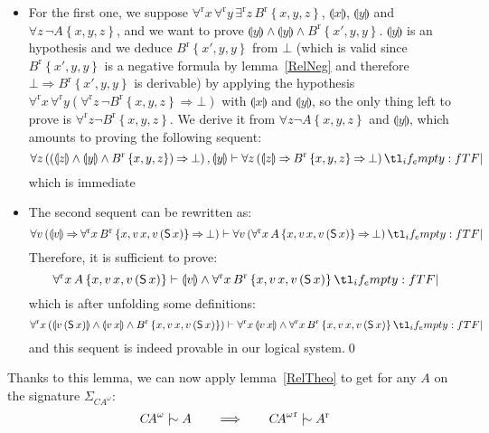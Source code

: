 \documentclass{CSML}
\newcommand*\ifpresent[3]{\tl_if_empty:fTF{#1}{#3}{#2}}
\newcommand*\Entails{\mathrel{\vdash}}
\newcommand*\Derives{\mathrel{|\mkern-8.75mu\sim}}
\newcommand*\BarSep{\mathrel{|}}
\newcommand*\Sequent[3]{#1\Entails#2\ifpresent{#3}{\BarSep}{}#3}
\newcommand*\LogVarA{x}
\newcommand*\LogVarB{y}
\newcommand*\LogVarC{z}
\newcommand*\LogVarE{v}
\newcommand*\LogConst[1]{\mathsf{#1}}
\newcommand*\LogImp{\mathbin{\Rightarrow}}
\newcommand*\LogAnd{\mathbin{\wedge}}
\newcommand*\LogBot\bot
\newcommand*\LogRel[1]{\llparenthesis#1\rrparenthesis}
\newcommand*\LogRelForm[1]{{#1^\mathrm{r}}}
\newcommand*\LogForallRel{\forall^\mathrm{r}}
\newcommand*\LogExistsRel{\exists^\mathrm{r}}
\newcommand*\LogFormA{A}
\newcommand*\LogFormB{B}
\newcommand*\LogSubst[1]{\left\{#1\right\}}
\newcommand*\CA{{C\!A}}
\newcommand*\CAom{{\CA^\omega}}
\newcommand*\CALogS{\LogConst{S}}
\begin{document}
\begin{itemize}
\item For the first one, we suppose $\LogForallRel\LogVarA\,\LogForallRel\LogVarB\,\LogExistsRel\LogVarC\,\LogRelForm{\LogFormB}\LogSubst{\LogVarA,\LogVarB,\LogVarC}$, $\LogRel{\LogVarA}$, $\LogRel{\LogVarB}$ and $\forall\LogVarC\,\neg\LogFormA\LogSubst{\LogVarA,\LogVarB,\LogVarC}$, and we want to prove $\LogRel{\LogVarB}\LogAnd\LogRel{\LogVarB}\LogAnd\LogRelForm{\LogFormB}\LogSubst{\LogVarA',\LogVarB,\LogVarB}$. $\LogRel{\LogVarB}$ is an hypothesis and we deduce $\LogRelForm{\LogFormB}\LogSubst{\LogVarA',\LogVarB,\LogVarB}$ from $\LogBot$ (which is valid since $\LogRelForm{\LogFormB}\LogSubst{\LogVarA',\LogVarB,\LogVarB}$ is a negative formula by lemma~\ref{RelNeg} and therefore $\LogBot\LogImp\LogRelForm{\LogFormB}\LogSubst{\LogVarA',\LogVarB,\LogVarB}$ is derivable) by applying the hypothesis $\LogForallRel\LogVarA\,\LogForallRel\LogVarB\left(\LogForallRel\LogVarC\,\neg\LogRelForm{\LogFormB}\LogSubst{\LogVarA,\LogVarB,\LogVarC}\LogImp\LogBot\right)$ with $\LogRel{\LogVarA}$ and $\LogRel{\LogVarB}$, so the only thing left to prove is $\LogForallRel\LogVarC\neg\LogRelForm{\LogFormB}\LogSubst{\LogVarA,\LogVarB,\LogVarC}$. We derive it from $\forall\LogVarC\neg\LogFormA\LogSubst{\LogVarA,\LogVarB,\LogVarC}$ and $\LogRel{\LogVarB}$, which amounts to proving the following sequent:
$$\Sequent{\forall\LogVarC\left(\left(\LogRel{\LogVarC}\LogAnd\LogRel{\LogVarB}\LogAnd\LogRelForm{\LogFormB}\LogSubst{\LogVarA,\LogVarB,\LogVarC}\right)\LogImp\LogBot\right),\LogRel{\LogVarB}}{\forall\LogVarC\left(\LogRel{\LogVarC}\LogImp\LogRelForm{\LogFormB}\LogSubst{\LogVarA,\LogVarB,\LogVarC}\LogImp\LogBot\right)}{}$$
which is immediate
\item The second sequent can be rewritten as:
$$\Sequent{\forall\LogVarE\left(\LogRel{\LogVarE}\LogImp\LogForallRel\LogVarA\,\LogRelForm{\LogFormB}\LogSubst{\LogVarA,\LogVarE\,\LogVarA,\LogVarE\left(\CALogS\,\LogVarA\right)}\LogImp\LogBot\right)}{\forall\LogVarE\left(\LogForallRel\LogVarA\,\LogFormA\LogSubst{\LogVarA,\LogVarE\,\LogVarA,\LogVarE\left(\CALogS\,\LogVarA\right)}\LogImp\LogBot\right)}{}$$
Therefore, it is sufficient to prove:
$$\Sequent{\LogForallRel\LogVarA\,\LogFormA\LogSubst{\LogVarA,\LogVarE\,\LogVarA,\LogVarE\left(\CALogS\,\LogVarA\right)}}{\LogRel{\LogVarE}\LogAnd\LogForallRel\LogVarA\,\LogRelForm{\LogFormB}\LogSubst{\LogVarA,\LogVarE\,\LogVarA,\LogVarE\left(\CALogS\,\LogVarA\right)}}{}$$
which is after unfolding some definitions:
$$\Sequent{\LogForallRel\LogVarA\left(\LogRel{\LogVarE\left(\CALogS\,\LogVarA\right)}\LogAnd\LogRel{\LogVarE\,\LogVarA}\LogAnd\LogRelForm{\LogFormB}\LogSubst{\LogVarA,\LogVarE\,\LogVarA,\LogVarE\left(\CALogS\,\LogVarA\right)}\right)}{\LogForallRel\LogVarA\,\LogRel{\LogVarE\,\LogVarA}\LogAnd\LogForallRel\LogVarA\,\LogRelForm{\LogFormB}\LogSubst{\LogVarA,\LogVarE\,\LogVarA,\LogVarE\left(\CALogS\,\LogVarA\right)}}{}$$
and this sequent is indeed provable in our logical system.\qed\end{itemize}
Thanks to this lemma, we can now apply lemma~\ref{RelTheo} to get for any $\LogFormA$ on the signature $\Sigma_\CAom$:
$$\CAom\Derives\LogFormA\qquad\Longrightarrow\qquad\LogRelForm{\CAom}\Derives\LogRelForm{\LogFormA}$$
\end{document}
